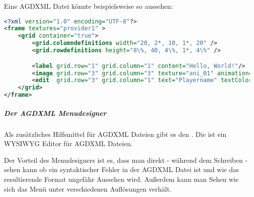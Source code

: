 Eine  AGDXML Datei könnte beispielsweise so aussehen:

\begin{lstlisting}[caption=Eine Beispiel AGDXML Menü Definition, title=\hspace{0 pt}, language=xml]
<?xml version="1.0" encoding="UTF-8"?>
<frame textures="provider1" >
	<grid container="true">
		<grid.columndefinitions width="20, 2*, 10, 1*, 20" />
		<grid.rowdefinitions height="8\%, 40, 4\%, 1*, 4\%" />

		<label grid.row="1" grid.column="1" content="Hello, World!"/>
		<image grid.row="3" grid.column="3" texture="ani_01" animation="750" id="myImage"/>
		<edit  grid.row="3" grid.column="1" text="Playername" textColor="BLACK" halign="LEFT" />
	</grid>
</frame>
\end{lstlisting}

\subparagraph{Der AGDXML Menudesigner}

Als zusätzliches Hilfsmittel für AGDXML Dateien gibt es den . Die ist ein WYSIWYG Editor für AGDXML Dateien.


Der Vorteil des Menudesigners ist es, dass man direkt - während dem Schreiben - sehen kann ob ein syntaktischer Fehler in der AGDXML Datei ist und wie das resultierende Format ungefähr Aussehen wird. Außerdem kann man Sehen wie sich das Menü unter verschiedenen Auflösungen verhält.